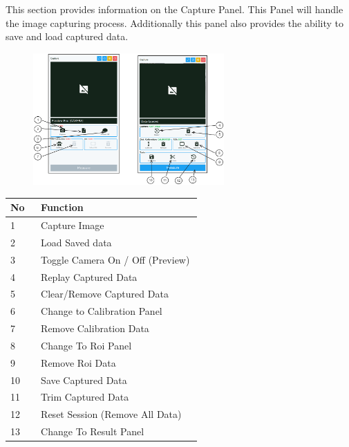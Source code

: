 This section provides information on the Capture Panel. This Panel will handle the image capturing process. Additionally this panel also provides the ability to save and load captured data.

\begin{figure}[H]
    \centering
    \includegraphics[width=0.65\textwidth]{texs/chapter1/image/p1.png}
\end{figure}

\begin{table}[!ht]
    \centering
    \begin{tabular}{p{0.05\linewidth} | p{0.5\linewidth}}
        \hline
        \textbf{No} & \textbf{Function}                \\ \hline
        1           & Capture Image                    \\ \hline
        2           & Load Saved data                  \\ \hline
        3           & Toggle Camera On / Off (Preview) \\ \hline
        4           & Replay Captured Data             \\ \hline
        5           & Clear/Remove Captured Data       \\ \hline
        6           & Change to Calibration Panel      \\ \hline
        7           & Remove Calibration Data          \\ \hline
        8           & Change To Roi Panel              \\ \hline
        9           & Remove Roi Data                  \\ \hline
        10          & Save Captured  Data              \\ \hline
        11          & Trim Captured Data               \\ \hline
        12          & Reset Session (Remove All Data)  \\ \hline
        13          & Change To Result Panel           \\ \hline
    \end{tabular}
\end{table}

